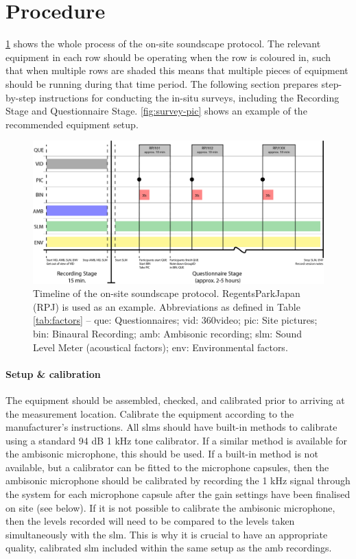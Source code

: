 \section{Procedure}
 \label{sec:proc}

 \cref{fig:timeline} shows the whole process of the on-site soundscape protocol. The relevant equipment in each row should be operating when the row is coloured in, such that when multiple rows are shaded this means that multiple pieces of equipment should be running during that time period. The following section prepares step-by-step instructions for conducting the in-situ surveys, including the Recording Stage and Questionnaire Stage. \cref{fig:survey-pic} shows an example of the recommended equipment setup.

 \begin{figure}[h]
   \centering
   \includegraphics[width=\textwidth]{Figures/Survey-Diagram_V2}
   \caption{Timeline of the on-site soundscape protocol. RegentsParkJapan (RPJ) is used as an example. Abbreviations as defined in Table \ref{tab:factors} -- \gls{que}: Questionnaires; \gls{vid}: 360\degree video; \gls{pic}: Site pictures; \gls{bin}: Binaural Recording; \gls{amb}: Ambisonic recording; \gls{slm}: Sound Level Meter (acoustical factors); \gls{env}: Environmental factors. \label{fig:timeline}}
 \end{figure}

 \paragraph*{Setup \& calibration} The equipment should be assembled, checked, and calibrated prior to arriving at the measurement location. Calibrate the equipment according to the manufacturer's instructions. All \gls{slm}s should have built-in methods to calibrate using a standard 94 dB 1 kHz tone calibrator. If a similar method is available for the ambisonic microphone, this should be used. If a built-in method is not available, but a calibrator can be fitted to the microphone capsules, then the ambisonic microphone should be calibrated by recording the 1 kHz signal through the system for each microphone capsule after the gain settings have been finalised on site (see below). If it is not possible to calibrate the ambisonic microphone, then the levels recorded will need to be compared to the levels taken simultaneously with the \gls{slm}. This is why it is crucial to have an appropriate quality, calibrated \gls{slm} included within the same setup as the \gls{amb} recordings.

